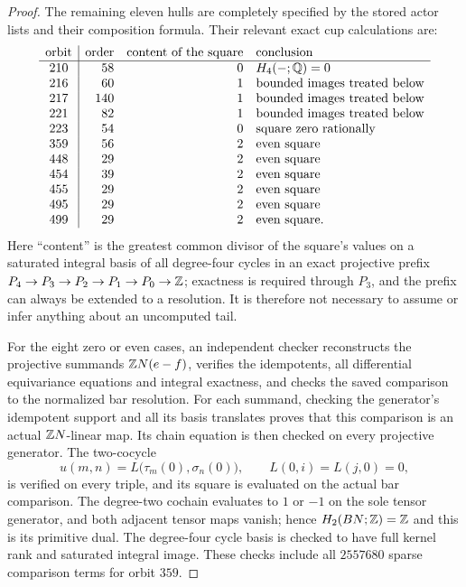 \begin{proof}
The remaining eleven hulls are completely specified by the stored
actor lists and their composition formula.  Their relevant exact
cup calculations are:
\[
\begin{array}{c|rrl}
\text{orbit}&\text{order}&\text{content of the square}&\text{conclusion}\\\hline
210&58&0&H_4(-;\mathbb Q)=0\\
216&60&1&\text{bounded images treated below}\\
217&140&1&\text{bounded images treated below}\\
221&82&1&\text{bounded images treated below}\\
223&54&0&\text{square zero rationally}\\
359&56&2&\text{even square}\\
448&29&2&\text{even square}\\
454&39&2&\text{even square}\\
455&29&2&\text{even square}\\
495&29&2&\text{even square}\\
499&29&2&\text{even square}.
\end{array}
\]
Here ``content'' is the greatest common divisor of the square's
values on a saturated integral basis of all degree-four cycles in
an exact projective prefix
$P_4\to P_3\to P_2\to P_1\to P_0\to\mathbb Z$;
exactness is required through $P_3$, and the prefix can always be
extended to a resolution.  It is therefore not necessary to assume
or infer anything about an uncomputed tail.

For the eight zero or even cases, an independent checker reconstructs
the projective summands $\mathbb Z N(e-f)$, verifies the idempotents,
all differential equivariance equations and integral exactness, and
checks the saved comparison to the normalized bar resolution.
For each summand, checking the generator's idempotent support and
all its basis translates proves that this comparison is an actual
$\mathbb Z N$-linear map.  Its chain equation is then checked on every
projective generator.  The two-cocycle
\[
 u(m,n)=L\bigl(\tau_m(0),\sigma_n(0)\bigr),
 \qquad L(0,i)=L(j,0)=0,
\]
is verified on every triple, and its square is evaluated on the
actual bar comparison.  The degree-two cochain evaluates to $1$ or
$-1$ on the sole tensor generator, and both adjacent tensor maps
vanish; hence $H_2(BN;\mathbb Z)=\mathbb Z$ and this is its primitive dual.
The degree-four cycle basis is checked to have full kernel rank
and saturated integral image.  These checks include all $2557680$
sparse comparison terms for orbit $359$.


\end{proof}
